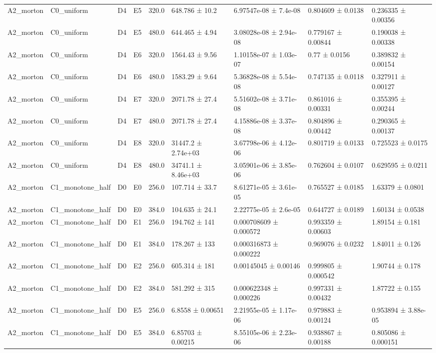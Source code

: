 \begin{table}
\begin{tabular}{lllllllll}
A2\_morton & C0\_uniform & D4 & E5 & 320.0 & 648.786 ± 10.2 & 6.97547e-08 ± 7.4e-08 & 0.804609 ± 0.0138 & 0.236335 ± 0.00356 \\
A2\_morton & C0\_uniform & D4 & E5 & 480.0 & 644.465 ± 4.94 & 3.08028e-08 ± 2.94e-08 & 0.779167 ± 0.00844 & 0.190038 ± 0.00338 \\
A2\_morton & C0\_uniform & D4 & E6 & 320.0 & 1564.43 ± 9.56 & 1.10158e-07 ± 1.03e-07 & 0.77 ± 0.0156 & 0.389832 ± 0.00154 \\
A2\_morton & C0\_uniform & D4 & E6 & 480.0 & 1583.29 ± 9.64 & 5.36828e-08 ± 5.54e-08 & 0.747135 ± 0.0118 & 0.327911 ± 0.00127 \\
A2\_morton & C0\_uniform & D4 & E7 & 320.0 & 2071.78 ± 27.4 & 5.51602e-08 ± 3.71e-08 & 0.861016 ± 0.00331 & 0.355395 ± 0.00244 \\
A2\_morton & C0\_uniform & D4 & E7 & 480.0 & 2071.78 ± 27.4 & 4.15886e-08 ± 3.37e-08 & 0.804896 ± 0.00442 & 0.290365 ± 0.00137 \\
A2\_morton & C0\_uniform & D4 & E8 & 320.0 & 31447.2 ± 2.74e+03 & 3.67798e-06 ± 4.12e-06 & 0.801719 ± 0.0133 & 0.725523 ± 0.0175 \\
A2\_morton & C0\_uniform & D4 & E8 & 480.0 & 34741.1 ± 8.46e+03 & 3.05901e-06 ± 3.85e-06 & 0.762604 ± 0.0107 & 0.629595 ± 0.0211 \\
A2\_morton & C1\_monotone\_half & D0 & E0 & 256.0 & 107.714 ± 33.7 & 8.61271e-05 ± 3.61e-05 & 0.765527 ± 0.0185 & 1.63379 ± 0.0801 \\
A2\_morton & C1\_monotone\_half & D0 & E0 & 384.0 & 104.635 ± 24.1 & 2.22775e-05 ± 2.6e-05 & 0.644727 ± 0.0189 & 1.60134 ± 0.0538 \\
A2\_morton & C1\_monotone\_half & D0 & E1 & 256.0 & 194.762 ± 141 & 0.000708609 ± 0.000572 & 0.993359 ± 0.00603 & 1.89154 ± 0.181 \\
A2\_morton & C1\_monotone\_half & D0 & E1 & 384.0 & 178.267 ± 133 & 0.000316873 ± 0.000222 & 0.969076 ± 0.0232 & 1.84011 ± 0.126 \\
A2\_morton & C1\_monotone\_half & D0 & E2 & 256.0 & 605.314 ± 181 & 0.00145045 ± 0.00146 & 0.999805 ± 0.000542 & 1.90744 ± 0.178 \\
A2\_morton & C1\_monotone\_half & D0 & E2 & 384.0 & 581.292 ± 315 & 0.000622348 ± 0.000226 & 0.997331 ± 0.00432 & 1.87722 ± 0.155 \\
A2\_morton & C1\_monotone\_half & D0 & E5 & 256.0 & 6.8558 ± 0.00651 & 2.21955e-05 ± 1.17e-06 & 0.979883 ± 0.00124 & 0.953894 ± 3.88e-05 \\
A2\_morton & C1\_monotone\_half & D0 & E5 & 384.0 & 6.85703 ± 0.00215 & 8.55105e-06 ± 2.23e-06 & 0.938867 ± 0.00188 & 0.805086 ± 0.000151 \\

\end{tabular}
\end{table}
